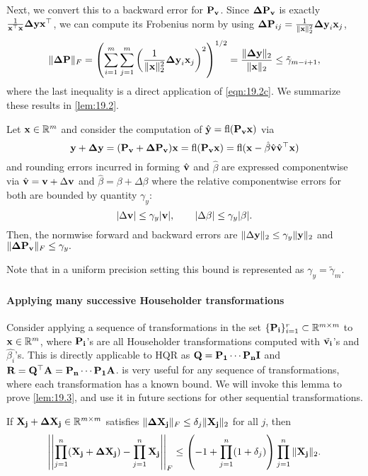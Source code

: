 Next, we convert this to a backward error for $\mathbf{P_v}$.
Since $\mathbf{\Delta P_v}$ is exactly $\frac{1}{\mathbf{x}^{\top}\mathbf{x}}\mathbf{\Delta y}\mathbf{x}^{\top}$, we can compute its Frobenius norm by using $\mathbf{\Delta P}_{ij} = \frac{1}{\|\mathbf{x}\|_2^2}\mathbf{\Delta y}_i\mathbf{x}_j$,
	\begin{equation}
	\|\bb{\Delta P}\|_F
	= \left(\sum_{i=1}^m\sum_{j=1}^m\left(\frac{1}{\|\bb{x}\|_2^2}\bb{\Delta y}_i\bb{x}_j\right)^2\right)^{1/2}
	=  \frac{\|\bb{\Delta y}\|_2}{\|\bb{x}\|_2} \leq \tilde{\gamma}_{m-i+1}\label{eqn:outer},
	\end{equation}
where the last inequality is a direct application of \cref{eqn:19.2c}.
We summarize these results in \cref{lem:19.2}.
\begin{lemma}
	\label{lem:19.2}
	Let $\mathbf{x}\in\mathbb{R}^m$ and consider the computation of $\hat{\mathbf{y}}=\mathrm{fl}(\mathbf{P_vx})$ via 
	\begin{equation*}
		\mathbf{y}+\mathbf{\Delta y} = (\mathbf{P_v} + \mathbf{\Delta P_v})\mathbf{x} =\mathrm{fl}(\mathbf{P_v}\mathbf{x}) = \mathrm{fl}(\mathbf{x}-\hat{\beta}\hat{\mathbf{v}}\hat{\mathbf{v}}^{\top}\mathbf{x})
	\end{equation*}
	and rounding errors incurred in forming $\hat{\mathbf{v}}$ and $\hat{\beta}$ are expressed componentwise via $\hat{\mathbf{v}} = \mathbf{v}+\Delta \mathbf{v}$ and $\hat{\beta} = \beta + \Delta \beta$ where the relative componentwise errors for both are bounded by quantity $\gamma_y$:  
	\begin{equation}
		|\Delta \mathbf{v}| \leq \gamma_y|\mathbf{v}|,\qquad |\Delta \beta| \leq\gamma_y |\beta|.
	\end{equation}
	Then, the normwise forward and backward errors are $\|\Delta \mathbf{y}\|_2 \leq \gamma_y\|\mathbf{y}\|_2$ and $ \|\mathbf{\Delta P_v}\|_F \leq \gamma_y.$
\end{lemma}
Note that in a uniform precision setting this bound is represented as $\gamma_y = \tilde{\gamma}_{m}$. 
\paragraph{Applying many successive Householder transformations}
Consider applying a sequence of transformations in the set $\{\mathbf{P_i}\}_{i=1}^r\subset\mathbb{R}^{m\times m}$ to $\mathbf{x}\in\mathbb{R}^m$, where $\mathbf{P_i}$'s are all Householder transformations computed with $\tilde{\mathbf{v_i}}$'s and $\hat{\beta_i}$'s.
This is directly applicable to HQR as $\mathbf{Q}=\mathbf{P_1}\cdots\mathbf{P_n}\mathbf{I}$ and $\mathbf{R} = \mathbf{Q}^{\top}\mathbf{A} = \mathbf{P_n}\cdots\mathbf{P_1}\mathbf{A}$.
 is very useful for any sequence of transformations, where each transformation has a known bound.
We will invoke this lemma to prove \cref{lem:19.3}, and use it in future sections for other sequential transformations.
\begin{lemma}\label{lem:3.7}
	If $\mathbf{X_j} + \mathbf{\Delta X_j} \in\mathbb{R}^{m\times m}$ satisfies $\|\mathbf{\Delta X_j}\|_F\leq \delta_j \|\mathbf{X_j}\|_2$ for all $j$, then $$\left|\left|\prod_{j=1}^n (\mathbf{X_j} + \mathbf{\Delta X_j})- \prod_{j=1}^n\mathbf{X_j} \right|\right|_F\leq\left(-1+\prod_{j=1}^n(1+\delta_j)\right)\prod_{j=1}^n\|\mathbf{X_j}\|_2.$$
\end{lemma}

